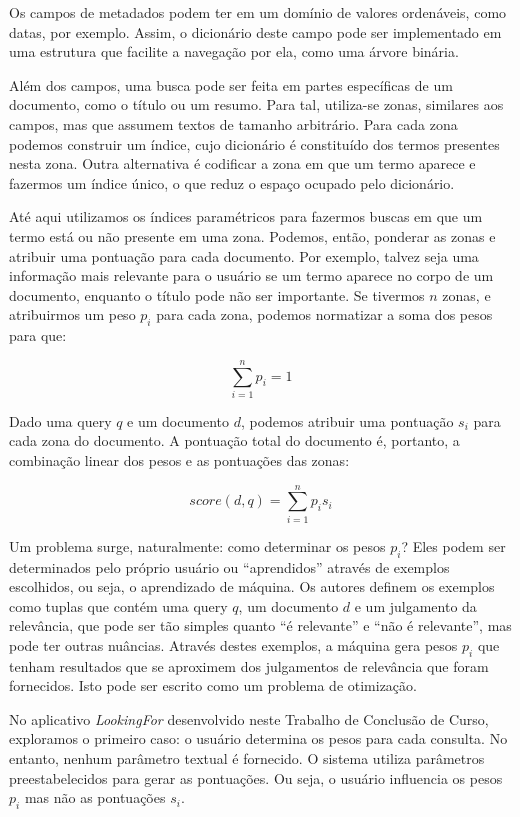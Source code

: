 Os campos de metadados podem ter em um domínio de valores ordenáveis, como datas, por exemplo. Assim, o dicionário deste campo pode ser implementado em uma estrutura que facilite a navegação por ela, como uma árvore binária.

Além dos campos, uma busca pode ser feita em partes específicas de um documento, como o título ou um resumo. Para tal, utiliza-se zonas, similares aos campos, mas que assumem textos de tamanho arbitrário. Para cada zona podemos construir um índice, cujo dicionário é constituído dos termos presentes nesta zona. Outra alternativa é codificar a zona em que um termo aparece e fazermos um índice único, o que reduz o espaço ocupado pelo dicionário.

Até aqui utilizamos os índices paramétricos para fazermos buscas em que um termo está ou não presente em uma zona. Podemos, então, ponderar as zonas e atribuir uma pontuação para cada documento. Por exemplo, talvez seja uma informação mais relevante para o usuário se um termo aparece no corpo de um documento, enquanto o título pode não ser importante. Se tivermos $n$ zonas, e atribuirmos um peso $p_{i}$ para cada zona, podemos normatizar a soma dos pesos para que:

\begin{displaymath}
	\sum_{i=1}^{n} p_{i} = 1
\end{displaymath}

Dado uma query $q$ e um documento $d$, podemos atribuir uma pontuação $s_{i}$ para cada zona do documento. A pontuação total do documento é, portanto, a combinação linear dos pesos e as pontuações das zonas:

\begin{displaymath}
	score(d,q)= \sum_{i=1}^{n} p_{i} s_{i}
\end{displaymath}

Um problema surge, naturalmente: como determinar os pesos $p_{i}$? Eles podem ser determinados pelo próprio usuário ou ``aprendidos'' através de exemplos escolhidos, ou seja, o aprendizado de máquina. Os autores definem os exemplos como tuplas que contém uma query $q$, um documento $d$ e um julgamento da relevância, que pode ser tão simples quanto ``é relevante'' e ``não é relevante'', mas pode ter outras nuâncias. Através destes exemplos, a máquina gera pesos $p_{i}$ que tenham resultados que se aproximem dos julgamentos de relevância que foram fornecidos. Isto pode ser escrito como um problema de otimização.

No aplicativo \emph{LookingFor} desenvolvido neste Trabalho de Conclusão de Curso, exploramos o primeiro caso: o usuário determina os pesos para cada consulta. No entanto, nenhum parâmetro textual é fornecido. O sistema utiliza parâmetros preestabelecidos para gerar as pontuações. Ou seja, o usuário influencia os pesos $p_{i}$ mas não as pontuações $s_{i}$.